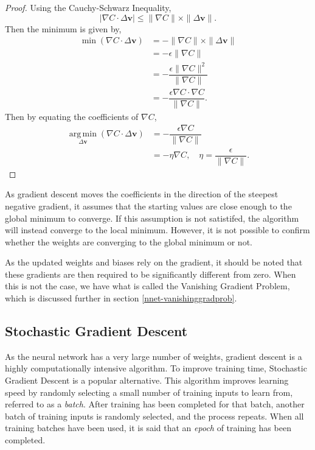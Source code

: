 \begin{proof}
	Using the Cauchy-Schwarz Inequality,
	\[
			|\nabla C\cdot\Delta\mathbf{v}| \le \|\nabla C\|\times\|\Delta\mathbf{v}\|.
	\]
	Then the minimum is given by, \begin{align*}
		\min(\nabla C\cdot\Delta\mathbf{v}) & = -\|\nabla C\|\times\|\Delta\mathbf{v}\| \\
		& = -\epsilon\|\nabla C\| \\
		& = -\dfrac{\epsilon\|\nabla C\|^2}{\|\nabla C\|} \\
		& = -\dfrac{\epsilon\nabla C\cdot\nabla C}{\|\nabla C\|}.
	\end{align*}
	Then by equating the coefficients of $\nabla C$,
	\begin{align*}
		\operatorname*{arg\,min}_{\Delta\mathbf{v}}(\nabla C\cdot\Delta\mathbf{v}) & = -\dfrac{\epsilon\nabla C}{\|\nabla C\|} \\
		& = -\eta\nabla C,\quad\eta = \dfrac{\epsilon}{\|\nabla C\|}.
	\end{align*}
\end{proof}

As gradient descent moves the coefficients in the direction of the steepest negative gradient, it assumes that the starting values are close enough to the global minimum to converge. If this assumption is not satistifed, the algorithm will instead converge to the local minimum. However, it is not possible to confirm whether the weights are converging to the global minimum or not.

%

As the updated weights and biases rely on the gradient, it should be noted that these gradients are then required to be significantly different from zero. When this is not the case, we have what is called the Vanishing Gradient Problem, which is discussed further in section \ref{nnet-vanishinggradprob}.

\subsection{Stochastic Gradient Descent}\label{nnets-stochgraddesc}

As the neural network has a very large number of weights, gradient descent is a highly computationally intensive algorithm. To improve training time, Stochastic Gradient Descent is a popular alternative. This algorithm improves learning speed by randomly selecting a small number of training inputs to learn from, referred to as a \textit{batch}. After training has been completed for that batch, another batch of training inputs is randomly selected, and the process repeats. When all training batches have been used, it is said that an \textit{epoch} of training has been completed.


